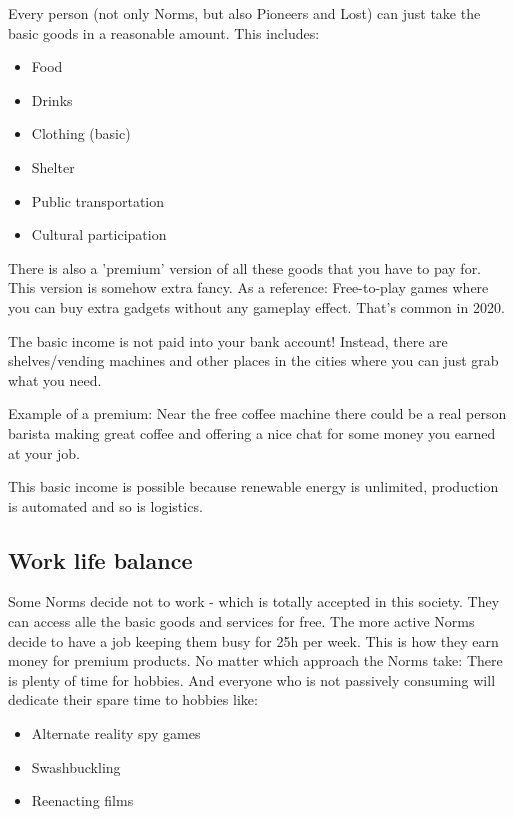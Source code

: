 Every person (not only Norms, but also Pioneers and Lost) can just take the basic goods in a reasonable amount. This includes:

\begin{itemize}
    \item Food
    \item Drinks
    \item Clothing (basic)
    \item Shelter
    \item Public transportation
    \item Cultural participation
\end{itemize}

There is also a 'premium' version of all these goods that you have to pay for. This version is somehow extra fancy. As a reference: Free-to-play games where you can buy extra gadgets without any gameplay effect. That's common in 2020.

The basic income is not paid into your bank account! Instead, there are shelves/vending machines and other places in the cities where you can just grab what you need.

Example of a premium: Near the free coffee machine there could be a real person barista making great coffee and offering a nice chat for some money you earned at your job.

This basic income is possible because renewable energy is unlimited, production is automated and so is logistics.

\subsection{Work life balance}

Some Norms decide not to work - which is totally accepted in this society. They can access alle the basic goods and services for free.
The more active Norms decide to have a job keeping them busy for 25h per week. This is how they earn money for premium products. No matter which approach the Norms take: There is plenty of time for hobbies. And everyone who is not passively consuming will dedicate their spare time to hobbies like:

\begin{itemize}
    \item Alternate reality spy games
    \item Swashbuckling
    \item Reenacting films
\end{itemize}


